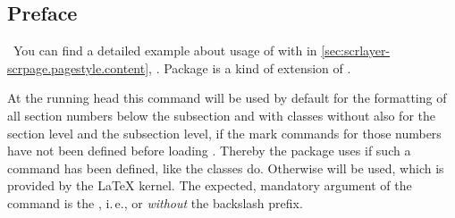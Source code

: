 \begin{Example}
\begin{lstcode}
  \tableofcontents
  \chapter*{Preface}
  \markboth{}{}
  \blindtext[20]
  \blinddocument
  
\end{lstcode}
\end{Example}
\else %
  \ You can find a detailed example about usage of  with
   in
  \autoref{sec:scrlayer-scrpage.pagestyle.content},
  . Package
   is a kind of extension of .%
\fi %
%
\EndIndexGroup
%
\fi %
\fi %


\ifshortversion\IgnoreThisfalse{}\fi
\ifIgnoreThis %
\else %
\ifCommonscrlayerscrpage\else %
\begin{Declaration}
\end{Declaration}
At the running head this command will be used by default for the formatting of
all section numbers below the subsection and with classes without
 also for the section level and the subsection level, if the
mark commands for those numbers have not been defined before loading
. Thereby the package uses  if such
a command has been defined, like the \KOMAScript{} classes do. Otherwise
 will be used, which is provided by the \LaTeX{}
kernel. The expected, mandatory argument of the command is the , i.\,e.,  or 
\emph{without} the backslash prefix.

